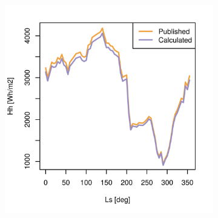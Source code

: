 \begin{figure}[H]
\captionsetup[subfigure]{justification=centering}
\vspace{-2ex}
\centering
    \setlength{\subfigureWidth}{0.50\textwidth}
    \setlength{\graphicsHeight}{80mm}
    \hypersetup{hidelinks=true}%
    \begin{subfigure}[t]{\subfigureWidth}
        \centering
            \includegraphics[height=\graphicsHeight]{sections/appendix/insolation-calculation-verification/plots/hh-exp-calc-at-vl1.png}
            \label{fig:sub:comparative-global-insolation-at-vl1-horizontal-daily-variations}
    \end{subfigure}\hfill
    \begin{subfigure}[t]{\subfigureWidth}
        \centering

\end{subfigure}
\end{figure}
